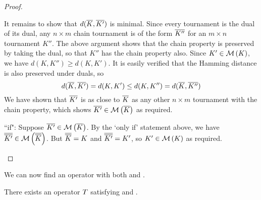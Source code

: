 \begin{proof}
\begin{itemize}
    It remains to show that $d({\overline{K}}, {\overline{K'}})$ is minimal. Since every
    tournament is the dual of its dual, any $n \times m$ chain tournament is of
    the form ${\overline{K''}}$ for an $m \times n$ tournament $K''$. The above
    argument shows that the chain property is preserved by taking the dual, so
    that $K''$ has the chain property also. Since $K' \in \operatorname{\mathcal{M}}\left({K}\right)$, we have
    $d(K, K'') \ge d(K, K')$. It is easily verified that the Hamming distance
    is also preserved under duals, so
    \[
        d({\overline{K}}, {\overline{K'}})
        = d(K, K')
        \le d(K, K'')
        = d({\overline{K}}, {\overline{K''}})
    \]
    We have shown that ${\overline{K'}}$ is as close to ${\overline{K}}$ as any other $n
    \times m$ tournament with the chain property, which shows ${\overline{K'}} \in
    \operatorname{\mathcal{M}}\left({{\overline{K}}}\right)$ as required.

    ``if": Suppose ${\overline{K'}} \in \operatorname{\mathcal{M}}\left({{\overline{K}}}\right)$. By the `only if' statement
    above, we have ${\overline{{\overline{K'}}}} \in \operatorname{\mathcal{M}}\left({{\overline{{\overline{K}}}}}\right)$. But
    ${\overline{{\overline{K}}}} = K$ and ${\overline{{\overline{K'}}}} = K'$, so $K' \in \operatorname{\mathcal{M}}\left({K}\right)$ as
    required.
    \end{itemize}
\end{proof}

We can now find an operator with both \chainmin{} and \dualaxiom{}.

\begin{proposition}
    \label{tourn_result_chainmin_dual_compatibility}
    There exists an operator $T$ satisfying \chainmin{} and
    \dualaxiom{}.
\end{proposition}

